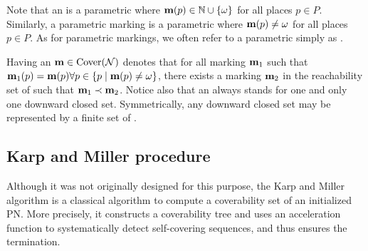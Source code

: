 Note that an \omark \marq is a parametric \omark where $\mathbf{m}(p) \in \mathbb{N} \cup \{\omega\}$ for all places $p \in P$.
Similarly, a parametric marking \marq is a parametric \omark where $\mathbf{m}(p) \neq \omega$ for all places $p \in P$.
As for parametric markings, we often refer to a parametric \omark simply as \omark.

Having an \omark $\mathbf{m} \in \operatorname{Cover}(\mathcal{N})$ denotes that for all marking $\mathbf{m}_1$ such that $\mathbf{m}_1(p) = \mathbf{m}(p) \forall p \in \{p \mid \mathbf{m}(p) \neq \omega\}$, there exists a marking $\mathbf{m}_2$ in the reachability set of \tupleN such that $\mathbf{m}_1 \prec \mathbf{m}_2$.
Notice also that an \omark always stands for one and only one downward closed set.
Symmetrically, any downward closed set may be represented by a finite set of \omarks.  

\subsection{Karp and Miller procedure}

Although it was not originally designed for this purpose, the Karp and Miller algorithm \cite{Karp69} is a classical algorithm to compute a coverability set of an initialized \ac{PN}.
More precisely, it constructs a coverability tree and uses an acceleration function to systematically detect self-covering sequences, and thus ensures the termination.

